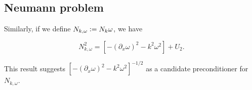 \documentclass[a4paper]{article}
\begin{document}
%



\subsection{Neumann problem}

Similarly, if we define $N_{k,\omega} \mathrel{\mathop:}= N_k \omega$, we have
\begin{The}
	\label{the:ParametrixNkomega}
	\[N_{k,\omega}^2 = \left[-(\partial_x \omega)^2 - k^2 \omega^2\right] + U_2. \]
\end{The}
This result suggests $\left[-(\partial_x \omega)^2 - k^2 \omega^2 \right]^{-1/2}$ as a candidate preconditioner for $N_{k,\omega}$.
\end{document}
